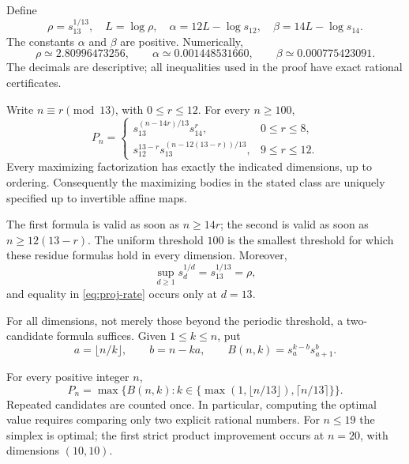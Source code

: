 Define
\begin{equation}\label{eq:proj-constants}
 \rho=s_{13}^{1/13},\quad L=\log\rho,\quad
 \alpha=12L-\log s_{12},\quad
 \beta=14L-\log s_{14}.
\end{equation}
The constants $\alpha$ and $\beta$ are positive. Numerically,
\[
 \rho\simeq2.80996473256,\qquad
 \alpha\simeq0.001448531660,\qquad
 \beta\simeq0.000775423091.
\]
The decimals are descriptive; all inequalities used in the proof have
exact rational certificates.

\begin{theorem}\label{thm:proj-optimum}
Write $n\equiv r\pmod {13}$, with $0\le r\le12$.
For every $n\ge100$,
\begin{equation}\label{eq:proj-exact}
 P_n=
 \begin{cases}
 s_{13}^{(n-14r)/13}s_{14}^{r},&0\le r\le8,\\[2mm]
 s_{12}^{13-r}s_{13}^{(n-12(13-r))/13},&9\le r\le12.
 \end{cases}
\end{equation}
Every maximizing factorization has exactly the indicated dimensions,
up to ordering. Consequently the maximizing bodies in the stated class
are uniquely specified up to invertible affine maps.

The first formula is valid as soon as $n\ge14r$; the second is valid as
soon as $n\ge12(13-r)$. The uniform threshold $100$ is the smallest
threshold for which these residue formulas hold in every dimension.
Moreover,
\begin{equation}\label{eq:proj-rate}
 \sup_{d\ge1}s_d^{1/d}=s_{13}^{1/13}=\rho,
\end{equation}
and equality in \eqref{eq:proj-rate} occurs only at $d=13$.
\end{theorem}

For all dimensions, not merely those beyond the periodic threshold, a
two-candidate formula suffices. Given $1\le k\le n$, put
\[
 a=\lfloor n/k\rfloor,\qquad b=n-ka,
 \qquad B(n,k)=s_a^{k-b}s_{a+1}^{b}.
\]

\begin{theorem}\label{thm:proj-two}
For every positive integer $n$,
\[
 P_n=\max\{B(n,k):
 k\in\{\max(1,\lfloor n/13\rfloor),\lceil n/13\rceil\}\}.
\]
Repeated candidates are counted once. In particular, computing the
optimal value requires comparing only two explicit rational numbers.
For $n\le19$ the simplex is optimal; the first strict product
improvement occurs at $n=20$, with dimensions $(10,10)$.
\end{theorem}

